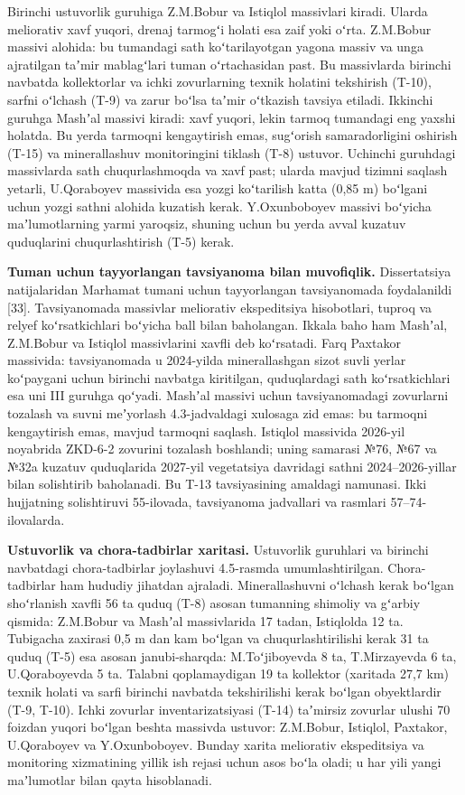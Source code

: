 \documentclass[14pt,a4paper,oneside]{extreport}
\begin{document}
Birinchi ustuvorlik guruhiga Z.M.Bobur va Istiqlol massivlari kiradi.
Ularda meliorativ xavf yuqori, drenaj tarmogʻi holati esa zaif yoki
oʻrta. Z.M.Bobur massivi alohida: bu tumandagi sath koʻtarilayotgan
yagona massiv va unga ajratilgan taʼmir mablagʻlari tuman oʻrtachasidan
past. Bu massivlarda birinchi navbatda kollektorlar va ichki
zovurlarning texnik holatini tekshirish (T-10), sarfni oʻlchash (T-9) va
zarur boʻlsa taʼmir oʻtkazish tavsiya etiladi. Ikkinchi guruhga Mashʼal
massivi kiradi: xavf yuqori, lekin tarmoq tumandagi eng yaxshi holatda.
Bu yerda tarmoqni kengaytirish emas, sugʻorish samaradorligini oshirish
(T-15) va minerallashuv monitoringini tiklash (T-8) ustuvor. Uchinchi
guruhdagi massivlarda sath chuqurlashmoqda va xavf past; ularda mavjud
tizimni saqlash yetarli, U.Qoraboyev massivida esa yozgi koʻtarilish
katta (0,85 m) boʻlgani uchun yozgi sathni alohida kuzatish kerak.
Y.Oxunboboyev massivi boʻyicha maʼlumotlarning yarmi yaroqsiz, shuning
uchun bu yerda avval kuzatuv quduqlarini chuqurlashtirish (T-5) kerak.

\textbf{Tuman uchun tayyorlangan tavsiyanoma bilan muvofiqlik.}
Dissertatsiya natijalaridan Marhamat tumani uchun tayyorlangan
tavsiyanomada foydalanildi {[}33{]}. Tavsiyanomada massivlar meliorativ
ekspeditsiya hisobotlari, tuproq va relyef koʻrsatkichlari boʻyicha ball
bilan baholangan. Ikkala baho ham Mashʼal, Z.M.Bobur va Istiqlol
massivlarini xavfli deb koʻrsatadi. Farq Paxtakor massivida:
tavsiyanomada u 2024-yilda minerallashgan sizot suvli yerlar koʻpaygani
uchun birinchi navbatga kiritilgan, quduqlardagi sath koʻrsatkichlari
esa uni III guruhga qoʻyadi. Mashʼal massivi uchun tavsiyanomadagi
zovurlarni tozalash va suvni meʼyorlash 4.3-jadvaldagi xulosaga zid
emas: bu tarmoqni kengaytirish emas, mavjud tarmoqni saqlash. Istiqlol
massivida 2026-yil noyabrida ZKD-6-2 zovurini tozalash boshlandi; uning
samarasi №76, №67 va №32a kuzatuv quduqlarida 2027-yil vegetatsiya
davridagi sathni 2024--2026-yillar bilan solishtirib baholanadi. Bu T-13
tavsiyasining amaldagi namunasi. Ikki hujjatning solishtiruvi
55-ilovada, tavsiyanoma jadvallari va rasmlari 57--74-ilovalarda.

\textbf{Ustuvorlik va chora-tadbirlar xaritasi.} Ustuvorlik guruhlari va
birinchi navbatdagi chora-tadbirlar joylashuvi 4.5-rasmda
umumlashtirilgan. Chora-tadbirlar ham hududiy jihatdan ajraladi.
Minerallashuvni oʻlchash kerak boʻlgan shoʻrlanish xavfli 56 ta quduq
(T-8) asosan tumanning shimoliy va gʻarbiy qismida: Z.M.Bobur va Mashʼal
massivlarida 17 tadan, Istiqlolda 12 ta. Tubigacha zaxirasi 0,5 m dan
kam boʻlgan va chuqurlashtirilishi kerak 31 ta quduq (T-5) esa asosan
janubi-sharqda: M.Toʻjiboyevda 8 ta, T.Mirzayevda 6 ta, U.Qoraboyevda 5
ta. Talabni qoplamaydigan 19 ta kollektor (xaritada 27,7 km) texnik
holati va sarfi birinchi navbatda tekshirilishi kerak boʻlgan
obyektlardir (T-9, T-10). Ichki zovurlar inventarizatsiyasi (T-14)
taʼmirsiz zovurlar ulushi 70 foizdan yuqori boʻlgan beshta massivda
ustuvor: Z.M.Bobur, Istiqlol, Paxtakor, U.Qoraboyev va Y.Oxunboboyev.
Bunday xarita meliorativ ekspeditsiya va monitoring xizmatining yillik
ish rejasi uchun asos boʻla oladi; u har yili yangi maʼlumotlar bilan
qayta hisoblanadi.
\end{document}
